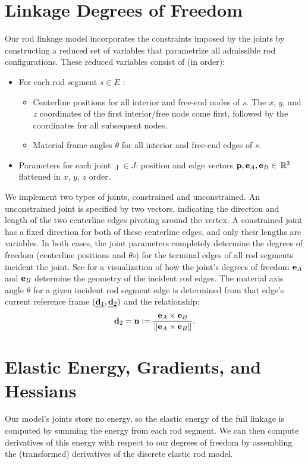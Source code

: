 \documentclass[10pt]{article}
\newcommand{\defeq}{\vcentcolon=}
\providecommand{\norm}[1]{\lVert#1\rVert}
\providecommand{\cross}{\times}
\renewcommand{\vec}[1]{{\bf #1}}
\newcommand\pr[1]{\prettyref{#1}}
\def\normal{{\bf n}}
\def\n{\normal}
\def\d{\vec{d}}
\def\p{\vec{p}}
\def\e{\vec{e}}
\def\R{\, \mathbb{R}}
\def\segment{s}
\def\joint{\jmath}
\begin{document}
\section{Linkage Degrees of Freedom}
Our rod linkage model incorporates the constraints imposed by the joints by
constructing a reduced set of variables that parametrize all
admissible rod configurations. These reduced variables consist of (in order):
\begin{itemize}
    \item For each rod segment $\segment \in E$ :
    \begin{itemize}
        \item Centerline positions for all interior and free-end nodes of $s$.
            The $x$, $y$, and $z$ coordinates of the first interior/free node
            come first, followed by the coordinates for all subsequent
            nodes.
        \item Material frame angles $\theta$ for all interior and free-end edges of
              $\segment$.
    \end{itemize}
    \item Parameters for each joint $\joint \in J$: position and edge vectors $\p, \e_A, \e_B
        \in \R^3$ flattened in $x$, $y$, $z$ order.
\end{itemize}
We implement two types of joints, constrained and unconstrained. An unconstrained
joint is specified by two vectors, indicating the direction and length of the two
centerline edges pivoting around the vertex. A constrained joint has a fixed
direction for both of these centerline edges, and only their lengths are
variables. In both cases, the joint parameters completely determine the
degrees of freedom (centerline positions and $\theta$s) for the terminal edges
of all rod segments incident the joint. See \pr{fig:joint_example} for a visualization of how
the joint's degrees of freedom $\e_A$ and $\e_B$ determine the geometry of the
incident rod edges. The material axis angle $\theta$ for a given incident rod
segment edge is determined from that edge's current reference frame
${(\underline{\d_1}, \underline{\d_2})}$ and the relationship:
$$
\d_2 = \n \defeq \frac{\e_A \cross \e_B}{\norm{\e_A \cross \e_B}}.
$$

\section{Elastic Energy, Gradients, and Hessians}
Our model's joints store no energy, so the elastic energy of the full
linkage is computed by summing the energy from each rod segment. We can then
compute derivatives of this energy with respect to our degrees of
freedom by assembling the (transformed) derivatives of the discrete
elastic rod model.
\end{document}
